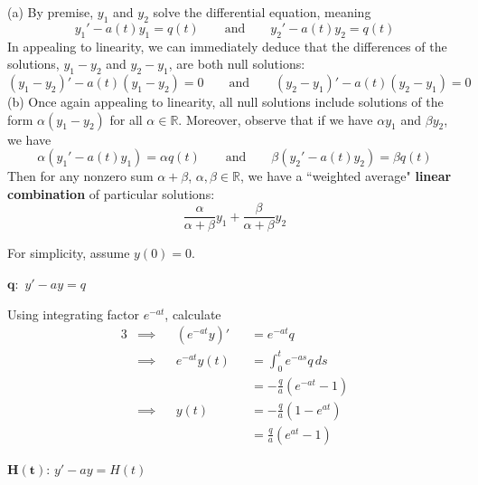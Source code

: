 \documentclass[a4paper]{article}
\begin{document}
(a) By premise, \(y_{1}\) and \(y_{2}\) solve the differential equation, meaning
\[
	y_{1}' - a \!\left( t \right) y_{1} = q \!\left( t \right) \qquad \text{and} \qquad y_{2}' - a \!\left( t \right) y_{2} = q \!\left( t \right) 
\]
In appealing to linearity, we can immediately deduce that the differences of the solutions, \(y_{1} - y_{2}\) and \(y_{2} - y_{1}\), are both null solutions:
\[
	\!\left( y_{1} - y_{2} \right)' - a \!\left( t \right) \!\left( y_{1} - y_{2} \right) = 0 \qquad \text{and} \qquad \!\left( y_{2} - y_{1} \right)' - a \!\left( t \right) \!\left( y_{2} - y_{1} \right) = 0
\]
(b) Once again appealing to linearity, all null solutions include solutions of the form \(\alpha \!\left( y_{1} - y_{2} \right)\) for all \(\alpha \in \mathbb{R}\). Moreover, observe that if we have \(\alpha y_{1}\) and \(\beta y_{2}\), we have
\[
	\alpha \!\left( y_{1}' - a \!\left( t \right) y_{1}\right) = \alpha q \!\left( t \right) \qquad \text{and} \qquad \beta \!\left( y_{2}' - a \!\left( t \right) y_{2} \right) = \beta q \!\left( t \right)  
\]
Then for any nonzero sum \(\alpha + \beta \), \(\alpha, \beta \in \mathbb{R}\), we have a ``weighted average" \textbf{linear combination} of particular solutions:
\[
	\frac{\alpha }{\alpha + \beta } y_{1} + \frac{\beta }{\alpha + \beta } y_{2}
\]


For simplicity, assume \(y \!\left( 0 \right) = 0\).

\(\bm{q}:\) \(y' - ay = q\)

Using integrating factor \(e^{-at}\), calculate
\begin{alignat*}{3}
	&\implies && \!\left( e^{-at}y \right)' && = e^{-at} q  \\
	&\implies && e^{-at} y \!\left( t \right) && = \int^{t}_{0} e^{-as}q  \, ds   \\ 
	& && && = -\frac{q }{a} \!\left( e^{-at} - 1 \right) \\ 
	&\implies && y \!\left( t \right) && = -\frac{q }{a} \!\left( 1 - e^{at} \right) \\
	& && && = \boxed{\frac{q }{a} \!\left( e^{at} - 1 \right) }
\end{alignat*}

\(\bm{H \!\left( t \right) }\): \(y' - ay = H \!\left( t \right) \)
\end{document}

